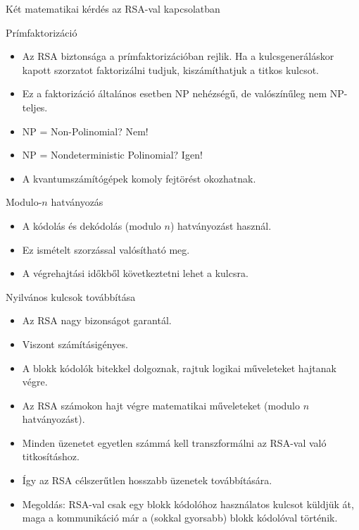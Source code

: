 \documentclass[12 pt]{beamer}
\begin{document}
\begin{frame}{Két matematikai kérdés az RSA-val kapcsolatban}
  \begin{block}{Prímfaktorizáció}
    \begin{itemize}
      \item{Az RSA biztonsága a prímfaktorizációban rejlik. Ha a kulcsgeneráláskor kapott szorzatot faktorizálni tudjuk,
        kiszámíthatjuk a titkos kulcsot.}
      \item{Ez a faktorizáció általános esetben NP nehézségű, de valószínűleg nem NP-teljes.}
      \item{NP = Non-Polinomial? Nem!}
      \item{NP = Nondeterministic Polinomial? Igen!}
      \item{A kvantumszámítógépek komoly fejtörést okozhatnak.}
    \end{itemize}
  \end{block}

  \begin{block}{Modulo-$n$ hatványozás}
    \begin{itemize}
      \item{A kódolás és dekódolás (modulo $n$) hatványozást használ.}
      \item{Ez ismételt szorzással valósítható meg.}
      \item{A végrehajtási időkből következtetni lehet a kulcsra.}
    \end{itemize}
  \end{block}
\end{frame}

\begin{frame}{Nyilvános kulcsok továbbítása}
  \begin{itemize}
    \item{Az RSA nagy bizonságot garantál.}
    \item{Viszont számításigényes.}
    \item{A blokk kódolók bitekkel dolgoznak, rajtuk logikai műveleteket hajtanak végre.}
    \item{Az RSA számokon hajt végre matematikai műveleteket (modulo $n$ hatványozást).}
    \item{Minden üzenetet egyetlen számmá kell transzformálni az RSA-val való titkosításhoz.}
    \item{Így az RSA célszerűtlen hosszabb üzenetek továbbítására.}
    \item{Megoldás: RSA-val csak egy blokk kódolóhoz használatos kulcsot küldjük át, maga a kommunikáció
      már a (sokkal gyorsabb) blokk kódolóval történik.}
  \end{itemize}
\end{frame}
\end{document}
